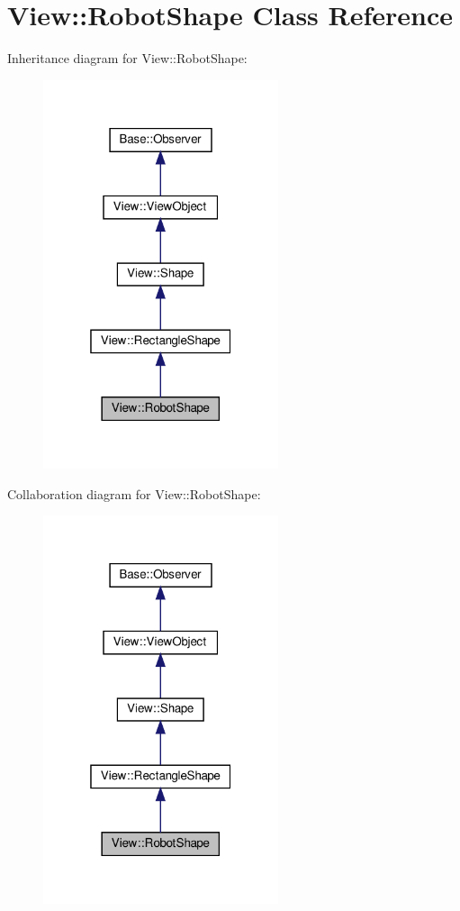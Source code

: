 \hypertarget{class_view_1_1_robot_shape}{}\section{View\+:\+:Robot\+Shape Class Reference}
\label{class_view_1_1_robot_shape}


Inheritance diagram for View\+:\+:Robot\+Shape\+:
\nopagebreak
\begin{figure}[H]
\begin{center}
\leavevmode
\includegraphics[width=196pt]{class_view_1_1_robot_shape__inherit__graph}
\end{center}
\end{figure}


Collaboration diagram for View\+:\+:Robot\+Shape\+:
\nopagebreak
\begin{figure}[H]
\begin{center}
\leavevmode
\includegraphics[width=196pt]{class_view_1_1_robot_shape__coll__graph}
\end{center}
\end{figure}

